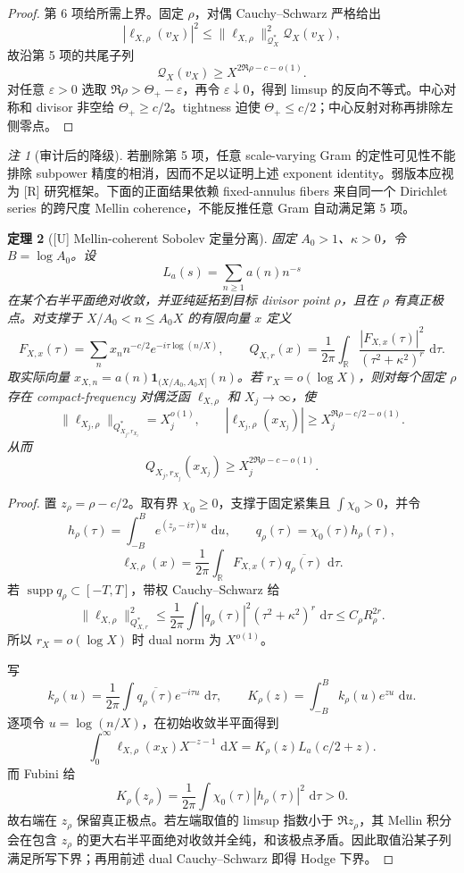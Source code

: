 \documentclass[UTF8,11pt,a4paper]{ctexart}
\newtheorem{theorem}{定理}[section]
\theoremstyle{definition}
\theoremstyle{remark}
\newtheorem{remark}[theorem]{注}
\newcommand{\R}{\mathbb R}
\newcommand{\dd}{\,\mathrm d}
\newcommand{\1}{\mathbf 1}
\newcommand{\cQ}{\mathcal Q}
\newcommand{\statusU}{\textnormal{[U]}}
\newcommand{\statusR}{\textnormal{[R]}}
\begin{document}
\begin{proof}
第 6 项给所需上界。固定 $\rho$，对偶 Cauchy--Schwarz 严格给出
\[
 |\ell_{X,\rho}(v_X)|^2
 \leq \|\ell_{X,\rho}\|_{\cQ_X^*}^2\cQ_X(v_X),
\]
故沿第 5 项的共尾子列
\[
  \cQ_X(v_X)\geq X^{2\Re\rho-c-o(1)}.
\]
对任意 $\varepsilon>0$ 选取 $\Re\rho>\Theta_+-\varepsilon$，再令 $\varepsilon\downarrow0$，得到 limsup 的反向不等式。中心对称和 divisor 非空给 $\Theta_+\geq c/2$。tightness 迫使 $\Theta_+\leq c/2$；中心反射对称再排除左侧零点。
\end{proof}

\begin{remark}[审计后的降级]
若删除第 5 项，任意 scale-varying Gram 的定性可见性不能排除 subpower 精度的相消，因而不足以证明上述 exponent identity。弱版本应视为 \statusR{} 研究框架。下面的正面结果依赖 fixed-annulus fibers 来自同一个 Dirichlet series 的跨尺度 Mellin coherence，不能反推任意 Gram 自动满足第 5 项。
\end{remark}

\begin{theorem}[\statusU{} Mellin-coherent Sobolev 定量分离]\label{thm:mellin-dual}
固定 $A_0>1$、$\kappa>0$，令 $B=\log A_0$。设
\[
 L_a(s)=\sum_{n\geq1}a(n)n^{-s}
\]
在某个右半平面绝对收敛，并亚纯延拓到目标 divisor point $\rho$，且在 $\rho$ 有真正极点。对支撑于 $X/A_0<n\leq A_0X$ 的有限向量 $x$ 定义
\[
 F_{X,x}(\tau)=\sum_nx_n n^{-c/2}e^{-i\tau\log(n/X)},\qquad
 Q_{X,r}(x)=\frac1{2\pi}\int_\R
 \frac{|F_{X,x}(\tau)|^2}{(\tau^2+\kappa^2)^r}\,\dd\tau .
\]
取实际向量 $x_{X,n}=a(n)\1_{(X/A_0,A_0X]}(n)$。若 $r_X=o(\log X)$，则对每个固定 $\rho$ 存在 compact-frequency 对偶泛函 $\ell_{X,\rho}$ 和 $X_j\to\infty$，使
\[
 \|\ell_{X_j,\rho}\|_{Q_{X_j,r_{X_j}}^*}=X_j^{o(1)},\qquad
 |\ell_{X_j,\rho}(x_{X_j})|
 \geq X_j^{\Re\rho-c/2-o(1)}.
\]
从而
\[
 Q_{X_j,r_{X_j}}(x_{X_j})
 \geq X_j^{2\Re\rho-c-o(1)}.
\]
\end{theorem}

\begin{proof}
置 $z_\rho=\rho-c/2$。取有界 $\chi_0\geq0$，支撑于固定紧集且 $\int\chi_0>0$，并令
\[
 h_\rho(\tau)=\int_{-B}^{B}e^{(z_\rho-i\tau)u}\,\dd u,
 \qquad q_\rho(\tau)=\chi_0(\tau)h_\rho(\tau),
\]
\[
 \ell_{X,\rho}(x)=\frac1{2\pi}\int_\R
 F_{X,x}(\tau)\overline{q_\rho(\tau)}\,\dd\tau .
\]
若 $\operatorname{supp}q_\rho\subset[-T,T]$，带权 Cauchy--Schwarz 给
\[
 \|\ell_{X,\rho}\|_{Q_{X,r}^*}^2
 \leq \frac1{2\pi}\int |q_\rho(\tau)|^2
       (\tau^2+\kappa^2)^r\,\dd\tau
 \leq C_\rho R_\rho^{2r}.
\]
所以 $r_X=o(\log X)$ 时 dual norm 为 $X^{o(1)}$。

写
\[
 k_\rho(u)=\frac1{2\pi}\int
 \overline{q_\rho(\tau)}e^{-i\tau u}\,\dd\tau,\qquad
 K_\rho(z)=\int_{-B}^{B}k_\rho(u)e^{zu}\,\dd u .
\]
逐项令 $u=\log(n/X)$，在初始收敛半平面得到
\[
 \int_0^\infty \ell_{X,\rho}(x_X)X^{-z-1}\,\dd X
   =K_\rho(z)L_a(c/2+z).
\]
而 Fubini 给
\[
 K_\rho(z_\rho)=\frac1{2\pi}\int
 \chi_0(\tau)|h_\rho(\tau)|^2\,\dd\tau>0.
\]
故右端在 $z_\rho$ 保留真正极点。若左端取值的 limsup 指数小于 $\Re z_\rho$，其 Mellin 积分会在包含 $z_\rho$ 的更大右半平面绝对收敛并全纯，和该极点矛盾。因此取值沿某子列满足所写下界；再用前述 dual Cauchy--Schwarz 即得 Hodge 下界。
\end{proof}
\end{document}

